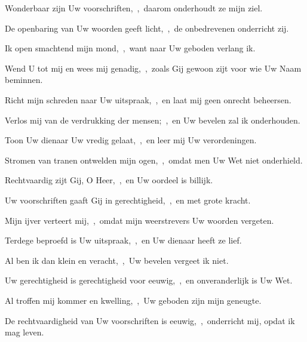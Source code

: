 \documentclass[12pt,twoside,a5paper]{article}
\begin{document}
\begin{halfparskip}
   Wonderbaar zijn Uw voorschriften,~\sep\ daarom onderhoudt ze mijn ziel.


  De openbaring van Uw woorden geeft licht,~\sep\ de onbedrevenen onderricht zij.

  Ik open smachtend mijn mond,~\sep\ want naar Uw geboden verlang ik.

  Wend U tot mij en wees mij genadig,~\sep\ zoals Gij gewoon zijt voor wie Uw Naam beminnen.

  Richt mijn schreden naar Uw uitspraak,~\sep\ en laat mij geen onrecht beheersen.

  Verlos mij van de verdrukking der mensen;~\sep\ en Uw bevelen zal ik onderhouden.

  Toon Uw dienaar Uw vredig gelaat,~\sep\ en leer mij Uw verordeningen.

  Stromen van tranen ontwelden mijn ogen,~\sep\ omdat men Uw Wet niet onderhield.
\end{halfparskip}

\begin{halfparskip}
   Rechtvaardig zijt Gij, O Heer,~\sep\ en Uw oordeel is billijk.


  Uw voorschriften gaaft Gij in gerechtigheid,~\sep\ en met grote kracht.

  Mijn ijver verteert mij,~\sep\ omdat mijn weerstrevers Uw woorden vergeten.

  Terdege beproefd is Uw uitspraak,~\sep\ en Uw dienaar heeft ze lief.

  Al ben ik dan klein en veracht,~\sep\ Uw bevelen vergeet ik niet.

  Uw gerechtigheid is gerechtigheid voor eeuwig,~\sep\ en onveranderlijk is Uw Wet.

  Al troffen mij kommer en kwelling,~\sep\ Uw geboden zijn mijn geneugte.

  De rechtvaardigheid van Uw voorschriften is eeuwig,~\sep\ onderricht mij, opdat ik mag leven.
\end{halfparskip}
\end{document}
